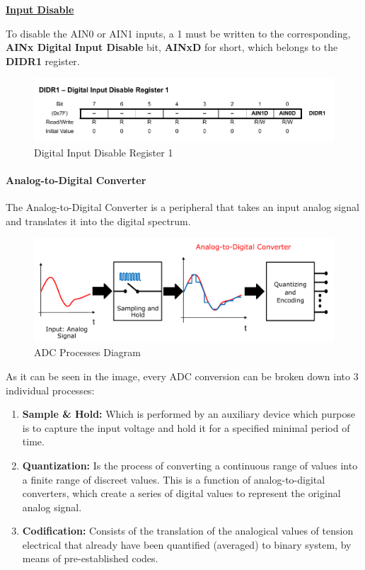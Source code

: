 \medskip
\underline{\textbf{Input Disable}}
\medskip

To disable the AIN0 or AIN1 inputs, a 1 must be written to the corresponding, \textbf{AINx Digital Input Disable} bit, \textbf{AINxD} for short, which belongs to the \textbf{DIDR1} register.

\begin{figure}[H]
    \centering
    \includegraphics[width = \textwidth]{Graphics/MICROS/Practice 3/DATASHEET/DIDR1.pdf}
    \caption{Digital Input Disable Register 1~\autocite{ATMEGA328P}}
    \label{fig:DIDR1}
\end{figure}



\paragraph{Analog-to-Digital Converter}

The Analog-to-Digital Converter is a peripheral that takes an input analog signal and translates it into the digital spectrum.

\begin{figure}[H]
    \centering
    \includegraphics[width = \textwidth]{Graphics/MICROS/Practice 3/DATASHEET/ADC_DIAGRAM.pdf}
    \caption{ADC Processes Diagram~\autocite{ADC_PROCESS}}
    \label{fig:ADC_DIAGRAM}
\end{figure}

As it can be seen in the image, every ADC conversion can be broken down into 3 individual processes:

\begin{enumerate}
    \item \textbf{Sample \& Hold:} Which is performed by an auxiliary device which purpose is to capture the input voltage and hold it for a specified minimal period of time.
    \item \textbf{Quantization:} Is the process of converting a continuous range of values into a finite range of discreet values. This is a function of analog-to-digital converters, which create a series of digital values to represent the original analog signal. 
    \item \textbf{Codification:} Consists of the translation of the analogical values of tension electrical that already have been quantified (averaged) to binary system, by means of pre-established codes.
\end{enumerate}


